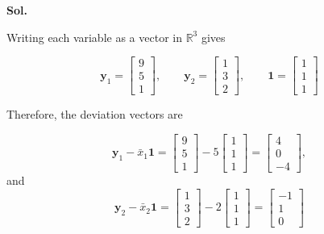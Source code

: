 \documentclass[12pt]{article}
\begin{document}
\textbf{Sol.}

\vspace{0.2cm}

Writing each variable as a vector in $\mathbb{R}^3$ gives

\vspace{0.2cm}

\[
\boldsymbol{y}_1=\begin{bmatrix}9\\5\\1\end{bmatrix},
\qquad
\boldsymbol{y}_2=\begin{bmatrix}1\\3\\2\end{bmatrix},
\qquad
\boldsymbol{1}=\begin{bmatrix}1\\1\\1\end{bmatrix}
\]

\vspace{0.2cm}

Therefore, the deviation vectors are

\vspace{0.2cm}

\[
\boldsymbol{y}_1-\bar{x}_1\boldsymbol{1}
=\begin{bmatrix}9\\5\\1\end{bmatrix}
-5\begin{bmatrix}1\\1\\1\end{bmatrix}
=\boxed{\begin{bmatrix}4\\0\\-4\end{bmatrix}},
\]
and
\[
\boldsymbol{y}_2-\bar{x}_2\boldsymbol{1}
=\begin{bmatrix}1\\3\\2\end{bmatrix}
-2\begin{bmatrix}1\\1\\1\end{bmatrix}
=\boxed{\begin{bmatrix}-1\\1\\0\end{bmatrix}}
\]
\end{document}
